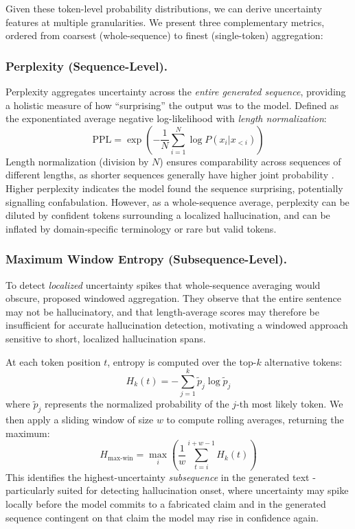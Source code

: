 Given these token-level probability distributions, we can derive uncertainty features at multiple granularities. We present three complementary metrics, ordered from coarsest (whole-sequence) to finest (single-token) aggregation:

\subsubsection{Perplexity (Sequence-Level).} Perplexity aggregates uncertainty across the \textit{entire generated sequence}, providing a holistic measure of how ``surprising'' the output was to the model. Defined as the exponentiated average negative log-likelihood with \textit{length normalization}:
\begin{equation}
\text{PPL} = \exp\left(-\frac{1}{N}\sum_{i=1}^{N} \log P(x_i | x_{<i})\right)
\end{equation}
Length normalization (division by $N$) ensures comparability across sequences of different lengths, as shorter sequences generally have higher joint probability \citep{sriramanan2024llmcheck}. Higher perplexity indicates the model found the sequence surprising, potentially signalling confabulation. However, as a whole-sequence average, perplexity can be diluted by confident tokens surrounding a localized hallucination, and can be inflated by domain-specific terminology or rare but valid tokens.

\subsubsection{Maximum Window Entropy (Subsequence-Level).} To detect \textit{localized} uncertainty spikes that whole-sequence averaging would obscure, \citet{sriramanan2024llmcheck} proposed windowed aggregation. They observe that the entire sentence may not be hallucinatory, and that length-average scores may therefore be insufficient for accurate hallucination detection, motivating a windowed approach sensitive to short, localized hallucination spans.

At each token position $t$, entropy is computed over the top-$k$ alternative tokens:
\begin{equation}
H_k(t) = -\sum_{j=1}^{k} \tilde{p}_j \log \tilde{p}_j
\end{equation}
where $\tilde{p}_j$ represents the normalized probability of the $j$-th most likely token. We then apply a sliding window of size $w$ to compute rolling averages, returning the maximum:
\begin{equation}
H_{\text{max-win}} = \max_{i} \left( \frac{1}{w} \sum_{t=i}^{i+w-1} H_k(t) \right)
\end{equation}
This identifies the highest-uncertainty \textit{subsequence} in the generated text - particularly suited for detecting hallucination onset, where uncertainty may spike locally before the model commits to a fabricated claim and in the generated sequence contingent on that claim the model may rise in confidence again.

